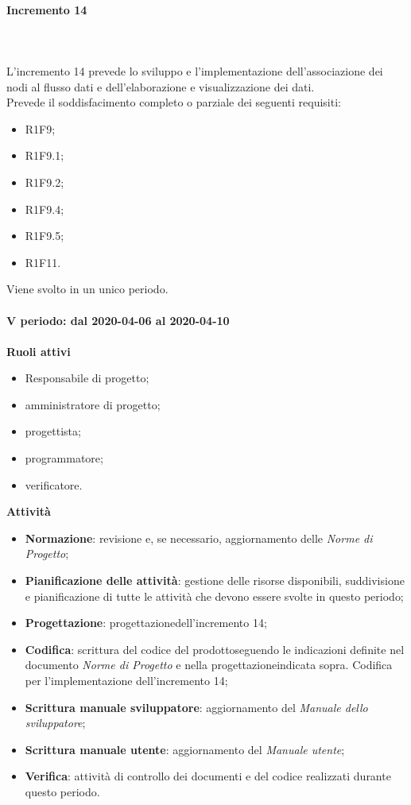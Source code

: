 \paragraph{Incremento 14} \mbox{} \\ \\
L'incremento 14 prevede lo sviluppo e l'implementazione dell'associazione dei nodi al flusso dati e dell'elaborazione e visualizzazione dei dati.
\\Prevede il soddisfacimento completo o parziale dei seguenti requisiti:
\begin{itemize}
	\item R1F9;
	\item R1F9.1;
	\item R1F9.2;
	\item R1F9.4;
	\item R1F9.5;
	\item R1F11.
\end{itemize}
Viene svolto in un unico periodo.
\mbox{} \\ \\ \textbf{V periodo: dal 2020-04-06 al 2020-04-10} \mbox{} \\ \\
\textbf{Ruoli attivi}
\begin{itemize}
	\item Responsabile di progetto\glo;
	\item amministratore di progetto\glo;
	\item progettista;
	\item programmatore;
	\item verificatore.
\end{itemize}
\textbf{Attività} 
\begin{itemize}
	\item \textbf{Normazione}: revisione e, se necessario, aggiornamento delle \textit{Norme di Progetto};
	\item \textbf{Pianificazione delle attività}: gestione delle risorse disponibili, suddivisione e pianificazione di tutte le attività che devono essere svolte in questo periodo;
	\item \textbf{Progettazione}\glo: progettazione\glosp dell'incremento 14;  
	\item \textbf{Codifica}: scrittura del codice del prodotto\glosp seguendo le indicazioni definite nel documento \textit{Norme di Progetto} e nella progettazione\glosp indicata sopra. Codifica per l'implementazione dell'incremento 14;
	\item \textbf{Scrittura manuale sviluppatore}: aggiornamento del \textit{Manuale dello sviluppatore};
	\item \textbf{Scrittura manuale utente}: aggiornamento del \textit{Manuale utente};
	\item \textbf{Verifica}: attività di controllo dei documenti e del codice realizzati durante questo periodo.
\end{itemize}
